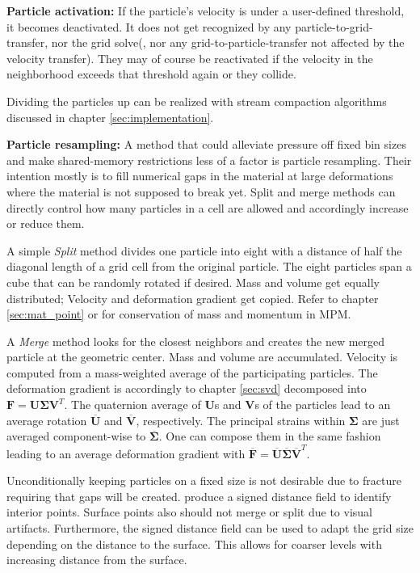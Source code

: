 \documentclass[m,times]{cgMA}
\begin{document}
\textbf{Particle activation:} If the particle's velocity is under a user-defined threshold, it becomes deactivated. It does not get recognized by any particle-to-grid-transfer, nor the grid solve(, nor any grid-to-particle-transfer not affected by the velocity transfer). They may of course be reactivated if the velocity in the neighborhood exceeds that threshold again or they collide. \cite{MPM:GPU}

Dividing the particles up can be realized with stream compaction algorithms discussed in chapter \ref{sec:implementation}.

\textbf{Particle resampling:} A method that could alleviate pressure off fixed bin sizes and make shared-memory restrictions less of a factor is particle resampling. Their intention mostly is to fill numerical gaps in the material at large deformations where the material is not supposed to break yet. Split and merge methods can directly control how many particles in a cell are allowed and accordingly increase or reduce them.

A simple \textit{Split} method divides one particle into eight with a distance of half the diagonal length of a grid cell from the original particle. The eight particles span a cube that can be randomly rotated if desired. Mass and volume get equally distributed; Velocity and deformation gradient get copied. Refer to chapter \ref{sec:mat_point} or for conservation of mass and momentum in MPM. \cite{gao2017adaptive}

A \textit{Merge} method looks for the closest neighbors and creates the new merged particle at the geometric center. Mass and volume are accumulated. Velocity is computed from a mass-weighted average of the participating particles. The deformation gradient is accordingly to chapter \ref{sec:svd} decomposed into $\boldsymbol{F} = \boldsymbol{U}\boldsymbol{\Sigma}\boldsymbol{V}^T$. The quaternion average of $\boldsymbol{U}$s and $\boldsymbol{V}$s of the particles lead to an average rotation $\overline{\boldsymbol{U}}$ and $\overline{\boldsymbol{V}}$, respectively. The principal strains within $\boldsymbol{\Sigma}$ are just averaged component-wise to $\overline{\boldsymbol{\Sigma}}$. One can compose them in the same fashion leading to an average deformation gradient with $\overline{\boldsymbol{F}} = \overline{\boldsymbol{U}}\overline{\boldsymbol{\Sigma}}\overline{\boldsymbol{V}}^T$.\cite{gao2017adaptive}

Unconditionally keeping particles on a fixed size is not desirable due to fracture requiring that gaps will be created. \cite{gao2017adaptive} produce a signed distance field to identify interior points. Surface points also should not merge or split due to visual artifacts. Furthermore, the signed distance field can be used to adapt the grid size depending on the distance to the surface. This allows for coarser levels with increasing distance from the surface.
\clearpage
\end{document}
